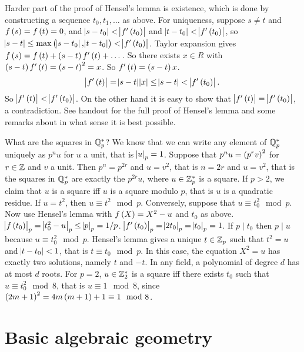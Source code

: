 Harder part of the proof of Hensel's lemma is existence, which is done by constructing a sequence $ t_0, t_1, \dots $ as above. For uniqueness, suppose $ s \ne t $ and $ f\br{s} = f\br{t} = 0 $, and $ \abs{s - t_0} < \abs{f'\br{t_0}} $ and $ \abs{t - t_0} < \abs{f'\br{t_0}} $, so $ \abs{s - t} \le \max\br{\abs{s - t_0}, \abs{t - t_0}} < \abs{f'\br{t_0}} $. Taylor expansion gives $ f\br{s} = f\br{t} + \br{s - t}f'\br{t} + \dots $. So there exists $ x \in R $ with $ \br{s - t}f'\br{t} = \br{s - t}^2 = x $. So $ f'\br{t} = \br{s - t}x $.
$$ \abs{f'\br{t}} = \abs{s - t}\abs{x} \le \abs{s - t} < \abs{f'\br{t_0}}. $$
So $ \abs{f'\br{t}} < \abs{f'\br{t_0}} $. On the other hand it is easy to show that $ \abs{f'\br{t}} = \abs{f'\br{t_0}} $, a contradiction. See handout for the full proof of Hensel's lemma and some remarks about in what sense it is best possible.


What are the squares in $ \mathbb{Q}_p^* $? We know that we can write any element of $ \mathbb{Q}_p^* $ uniquely as $ p^nu $ for $ u $ a unit, that is $ \abs{u}_p = 1 $. Suppose that $ p^nu = \br{p^rv}^2 $ for $ r \in \mathbb{Z} $ and $ v $ a unit. Then $ p^n = p^{2r} $ and $ u = v^2 $, that is $ n = 2r $ and $ u = v^2 $, that is the squares in $ \mathbb{Q}_p^* $ are exactly the $ p^{2r}u $, where $ u \in \mathbb{Z}_p^* $ is a square. If $ p > 2 $, we claim that $ u $ is a square iff $ u $ is a square modulo $ p $, that is $ u $ is a quadratic residue. If $ u = t^2 $, then $ u \equiv t^2 \mod p $. Conversely, suppose that $ u \equiv t_0^2 \mod p $. Now use Hensel's lemma with $ f\br{X} = X^2 - u $ and $ t_0 $ as above. $ \abs{f\br{t_0}}_p = \abs{t_0^2 - u}_p \le \abs{p}_p = 1 / p $. $ \abs{f'\br{t_0}}_p = \abs{2t_0}_p = \abs{t_0}_p = 1 $. If $ p \mid t_0 $ then $ p \mid u $ because $ u \equiv t_0^2 \mod p $. Hensel's lemma gives a unique $ t \in \mathbb{Z}_p $ such that $ t^2 = u $ and $ \abs{t - t_0} < 1 $, that is $ t \equiv t_0 \mod p $. In this case, the equation $ X^2 = u $ has exactly two solutions, namely $ t $ and $ -t $. In any field, a polynomial of degree $ d $ has at most $ d $ roots. For $ p = 2 $, $ u \in \mathbb{Z}_2^* $ is a square iff there exists $ t_0 $ such that $ u \equiv t_0^2 \mod 8 $, that is $ u \equiv 1 \mod 8 $, since $ \br{2m + 1}^2 = 4m\br{m + 1} + 1 \equiv 1 \mod 8 $.

\pagebreak

\section{Basic algebraic geometry}

